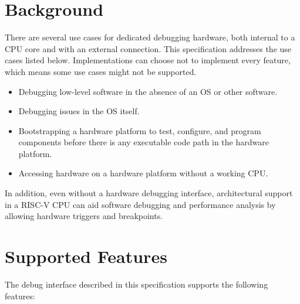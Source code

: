 %

\section{Background}

There are several use cases for dedicated debugging hardware, both
internal to a CPU core and with an external connection.
This specification addresses the use cases listed below. Implementations
can choose not to implement every feature, which means some use cases might
not be supported.

\begin{itemize}

\item Debugging low-level software in the absence of an OS or other software.

\item Debugging issues in the OS itself.

\item Bootstrapping a hardware platform to test, configure, and program components before
  there is any executable code path in the hardware platform.

\item Accessing hardware on a hardware platform without a working CPU.

\end{itemize}

In addition, even without a hardware debugging interface,
architectural support in a RISC-V CPU can aid software debugging and
performance analysis by allowing hardware triggers and breakpoints.

\section{Supported Features}

The debug interface described in this specification supports the following features:

